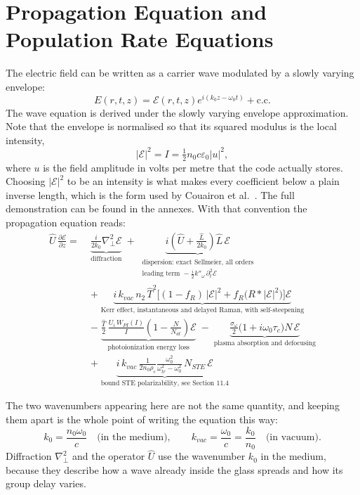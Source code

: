 \section{Propagation Equation and Population Rate Equations}

The electric field can be written as a carrier wave modulated by a slowly varying envelope:
$$ E(r,t,z) = \mathcal{E}(r,t,z)e^{i(k_0z-\omega_0 t)} + \text{c.c.} $$
The wave equation is derived under the slowly varying envelope approximation. Note that the envelope is normalised so that its squared modulus is the local intensity,
\begin{equation}
\label{eq:envelope_norm}
|\mathcal{E}|^2 = I = \tfrac{1}{2}n_0c\varepsilon_0|u|^2 ,
\end{equation}
where $u$ is the field amplitude in volts per metre that the code actually stores. Choosing $|\mathcal{E}|^2$ to be an intensity is what makes every coefficient below a plain inverse length, which is the form used by Couairon et al.~\cite{PhysRevB.71.125435}. The full demonstration can be found in the annexes. With that convention the propagation equation reads:
\begin{align}
\label{eq:master_propagation}
\hat{U}\,\frac{\partial \mathcal{E}}{\partial z} =\;
&\underbrace{\frac{i}{2k_0}\nabla_\perp^2 \mathcal{E}}_{\text{diffraction}}
\;+\;
\underbrace{i\left(\hat{U}+\frac{\hat{L}}{2k_0}\right)\hat{L}\,\mathcal{E}}_{\substack{\text{dispersion: exact Sellmeier, all orders}\\
\text{leading term } -\tfrac{i}{2}k''_\omega\,\partial_t^2 \mathcal{E}}} \nonumber\\[4pt]
&+\;\underbrace{i\,k_{vac}\,n_2\,\hat{T}^{2}\Big[(1-f_R)\,|\mathcal{E}|^2 + f_R\big(R * |\mathcal{E}|^2\big)\Big]\mathcal{E}}_{\text{Kerr effect, instantaneous and delayed Raman, with self-steepening}} \nonumber\\[4pt]
&-\;\underbrace{\frac{\hat{T}}{2}\,\frac{U_i\,W_{PI}(I)}{I}\left(1-\frac{N}{N_{at}}\right)\mathcal{E}}_{\text{photoionization energy loss}}
\;-\;\underbrace{\frac{\sigma_\omega}{2}\big(1+i\omega_0\tau_c\big)N\,\mathcal{E}}_{\text{plasma absorption and defocusing}} \nonumber\\[4pt]
&+\;\underbrace{i\,k_{vac}\,\frac{1}{2n_0\rho_c}\frac{\omega_0^2}{\omega_{tr}^2-\omega_0^2}\,N_{STE}\,\mathcal{E}}_{\text{bound STE polarizability, see Section~11.4}}
\end{align}

The two wavenumbers appearing here are not the same quantity, and keeping them apart is the whole point of writing the equation this way:
\begin{equation}
\label{eq:two_wavenumbers}
k_0 = \frac{n_0\omega_0}{c}\quad\text{(in the medium)},
\qquad
k_{vac} = \frac{\omega_0}{c} = \frac{k_0}{n_0}\quad\text{(in vacuum)} .
\end{equation}
Diffraction $\nabla^2_\perp$ and the operator $\hat{U}$ use the wavenumber $k_0$ in the medium, because they describe how a wave already inside the glass spreads and how its group delay varies.


